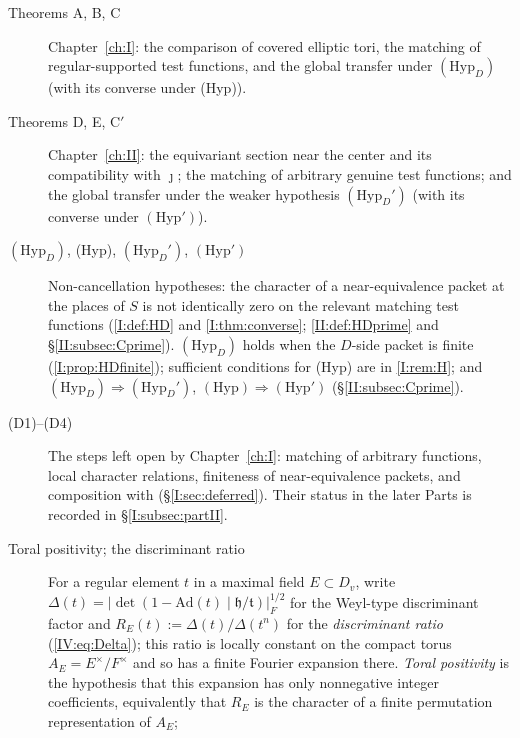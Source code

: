 \begin{description}
\item[Theorems A, B, C] Chapter~\ref{ch:I}: the comparison of covered elliptic
tori, the matching of regular-supported test functions, and the
global transfer under $(\mathrm{Hyp}_D)$ (with its converse under (Hyp)).
\item[Theorems D, E, C$'$] Chapter~\ref{ch:II}: the equivariant section near the
center and its compatibility with $\jmath$; the matching of arbitrary
genuine test functions; and the global transfer under the weaker
hypothesis $(\mathrm{Hyp}_D')$ (with its converse under $(\mathrm{Hyp}')$).
\item[$(\mathrm{Hyp}_D)$, (Hyp), $(\mathrm{Hyp}_D')$, $(\mathrm{Hyp}')$]
Non-cancellation hypotheses: the character of a near-equivalence
packet at the places of $S$ is not identically zero on the relevant
matching test functions (\cref{I:def:HD} and
\cref{I:thm:converse}; \cref{II:def:HDprime} and \S\ref{II:subsec:Cprime}).  $(\mathrm{Hyp}_D)$
holds when the $D$-side packet is finite (\cref{I:prop:HDfinite}); sufficient conditions for (Hyp) are in \cref{I:rem:H}; and $(\mathrm{Hyp}_D)\Rightarrow(\mathrm{Hyp}_D')$,
$(\mathrm{Hyp})\Rightarrow(\mathrm{Hyp}')$ (\S\ref{II:subsec:Cprime}).
\item[(D1)--(D4)] The steps left open by Chapter~\ref{ch:I}: matching of
arbitrary functions, local character relations, finiteness of
near-equivalence packets, and composition with \cite{JC26a} (\S\ref{I:sec:deferred}).
Their status in the later Parts is recorded in \S\ref{I:subsec:partII}.
\item[Toral positivity; the discriminant ratio] For a regular
element $t$ in a maximal field $E\subset D_v$, write
$\Delta(t)=\lvert\det(1-\mathrm{Ad}(t)\mid\mathfrak h/\mathfrak
t)\rvert_F^{1/2}$ for the Weyl-type discriminant factor and
$R_E(t):=\Delta(t)/\Delta(t^n)$ for the \emph{discriminant ratio}
(\eqref{IV:eq:Delta}); this ratio is locally constant on the compact
torus $A_E=E^\times/F^\times$ and so has a finite Fourier expansion
there. \emph{Toral positivity} is the hypothesis that this expansion
has only nonnegative integer coefficients, equivalently that $R_E$ is
the character of a finite permutation representation of $A_E$;

\end{description}
